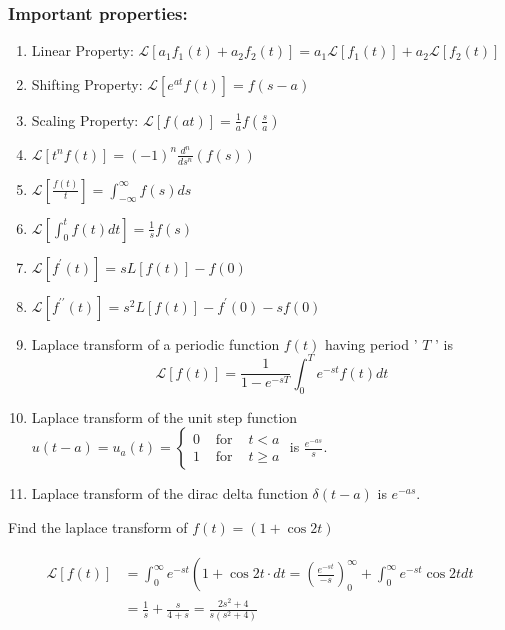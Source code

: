 \subsubsection{Important properties:}
\begin{enumerate}
	\item Linear Property: $\mathcal{L}\left[a_{1} f_{1}(t)+a_{2} f_{2}(t)\right]=a_{1} \mathcal{L}\left[f_{1}(t)\right]+a_{2} \mathcal{L}\left[f_{2}(t)\right]$
	\item Shifting Property: $\mathcal{L}\left[e^{a t} f(t)\right]=f(s-a)$
	\item Scaling Property: $\mathcal{L}[f(a t)]=\frac{1}{a} f\left(\frac{s}{a}\right)$
	\item $\mathcal{L}\left[t^{n} f(t)\right]=(-1)^{n} \frac{d^{n}}{d s^{n}}(f(s))$
	\item $\mathcal{L}\left[\frac{f(t)}{t}\right]=\int_{-\infty}^{\infty} f(s) d s$
	\item $\mathcal{L}\left[\int_{0}^{t} f(t) d t\right]=\frac{1}{s} f(s)$
	\item $\mathcal{L}\left[f^{\prime}(t)\right]=s L[f(t)]-f(0)$
	\item  $\mathcal{L}\left[f^{\prime \prime}(t)\right]=s^{2} L[f(t)]-f^{\prime}(0)-s f(0)$
	\item Laplace transform of a periodic function $f(t)$ having period ' $T$ ' is $$\mathcal{L}[f({t})]=\frac{1}{1-e^{-s T}} \int_{0}^{T} e^{-s t} f({t}) d {t}$$
	\item Laplace transform of the unit step function $u(t-a)=u_{a}(t)=\left\{\begin{array}{lll}0 & \text { for } & t<a \\ 1 & \text { for } & t \geq a\end{array}\right.$ is $\frac{e^{-a s}}{s}$.
	\item Laplace transform of the dirac delta function $\delta(t-a)$ is $e^{-a s}$.
\end{enumerate}
\begin{exercise}
	Find the laplace transform of $f(t)=(1+\cos 2 t)$
\end{exercise}
\begin{answer}
	\begin{align*}
	\begin{aligned}
	\mathcal{L}[f(t)] &=\int_{0}^{\infty} e^{-s t}\left(1+\cos 2 t \cdot d t=\left(\frac{e^{-s t}}{-s}\right)_{0}^{\infty}+\int_{0}^{\infty} e^{-s t} \cos 2 t d t\right.\\
	&=\frac{1}{s}+\frac{s}{4+s}=\frac{2 s^{2}+4}{s\left(s^{2}+4\right)}
	\end{aligned}
	\end{align*}
\end{answer}
